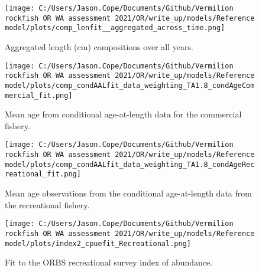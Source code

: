 \documentclass[11pt,
  english,
  a4paper,
]{article}
\begin{document}
\tagmcend\tagstructend


\begin{figure}
\centering
\texttt{[image: C:/Users/Jason.Cope/Documents/Github/Vermilion rockfish OR WA assessment 2021/OR/write\_up/models/Reference model/plots/comp\_lenfit\_\_aggregated\_across\_time.png]}
\caption{Aggregated length (cm) compositions over all years.\label{fig:agg-len-fit}}
\end{figure}

\tagmcend\tagstructend


\begin{figure}
\centering
\texttt{[image: C:/Users/Jason.Cope/Documents/Github/Vermilion rockfish OR WA assessment 2021/OR/write\_up/models/Reference model/plots/comp\_condAALfit\_data\_weighting\_TA1.8\_condAgeCommercial\_fit.png]}
\caption{Mean age from conditional age-at-length data for the commercial fishery.\label{fig:com-mean-caal}}
\end{figure}

\tagmcend\tagstructend


\begin{figure}
\centering
\texttt{[image: C:/Users/Jason.Cope/Documents/Github/Vermilion rockfish OR WA assessment 2021/OR/write\_up/models/Reference model/plots/comp\_condAALfit\_data\_weighting\_TA1.8\_condAgeRecreational\_fit.png]}
\caption{Mean age observations from the conditional age-at-length data from the recreational fishery.\label{fig:rec-mean-caal}}
\end{figure}

\tagmcend\tagstructend


\begin{figure}
\centering
\texttt{[image: C:/Users/Jason.Cope/Documents/Github/Vermilion rockfish OR WA assessment 2021/OR/write\_up/models/Reference model/plots/index2\_cpuefit\_Recreational.png]}
\caption{Fit to the ORBS recreational survey index of abundance.\label{fig:orbs-index-fit}}
\end{figure}
\end{document}
